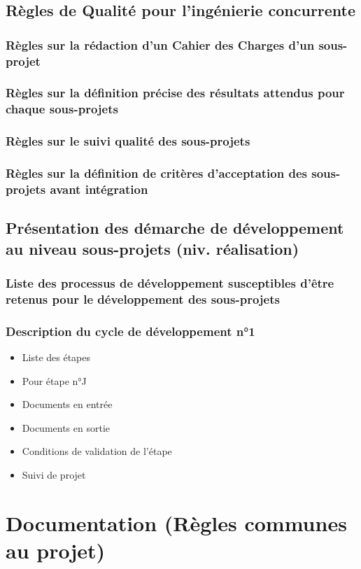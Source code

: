 \subsection{Règles de Qualité pour l’ingénierie concurrente}
\subsubsection{Règles sur la rédaction d’un Cahier des Charges d’un sous-projet}
\subsubsection{Règles sur la définition précise des résultats attendus pour chaque sous-projets}
\subsubsection{Règles sur le suivi qualité des sous-projets}
\subsubsection{Règles sur la définition de critères d’acceptation des sous-projets avant intégration}
\subsection{Présentation des démarche de développement au niveau sous-projets (niv. réalisation)}
\subsubsection{Liste des processus de développement susceptibles d’être retenus pour le développement des sous-projets}
\subsubsection{Description du cycle de développement n°1}
\begin{itemize}
  \item Liste des étapes
  \item Pour étape n°J
  \item Documents en entrée
  \item Documents en sortie
  \item Conditions de validation de l’étape
  \item Suivi de projet
\end{itemize}
 
\section{Documentation (Règles communes au projet)}
